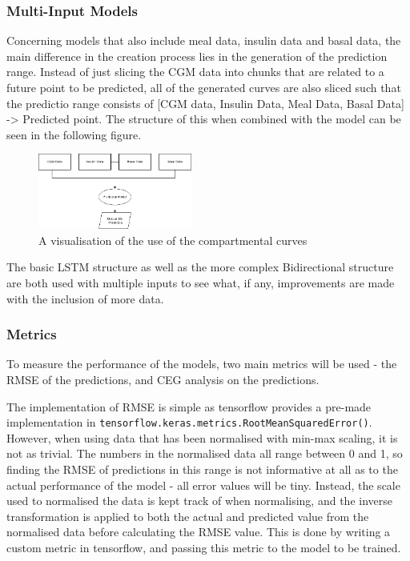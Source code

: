       \subsubsection{Multi-Input Models}

      Concerning models that also include meal data, insulin data and basal data, the main difference in the creation process lies in the generation of the prediction range. Instead of just slicing the CGM data into chunks that are related to a future point to be predicted, all of the generated curves are also sliced such that the predictio range consists of [CGM data, Insulin Data, Meal Data, Basal Data] -> Predicted point. The structure of this when combined with the model can be seen in the following figure.

      \begin{figure}[H]
        \centering

        \includegraphics[width=0.45\textwidth]{images/multiIn.png}
        \caption{
         A visualisation of the use of the compartmental curves
        }
      \end{figure}

      The basic LSTM structure as well as the more complex Bidirectional structure are both used with multiple inputs to see what, if any, improvements are made with the inclusion of more data.

      \subsubsection{Metrics}

      To measure the performance of the models, two main metrics will be used - the RMSE of the predictions, and CEG analysis on the predictions.

      The implementation of RMSE is simple as tensorflow provides a pre-made implementation in \Verb+tensorflow.keras.metrics.RootMeanSquaredError()+. However, when using data that has been normalised with min-max scaling, it is not as trivial. The numbers in the normalised data all range between 0 and 1, so finding the RMSE of predictions in this range is not informative at all as to the actual performance of the model - all error values will be tiny. Instead, the scale used to normalised the data is kept track of when normalising, and the inverse transformation is applied to both the actual and predicted value from the normalised data before calculating the RMSE value. This is done by writing a custom metric in tensorflow, and passing this metric to the model to be trained.
      
